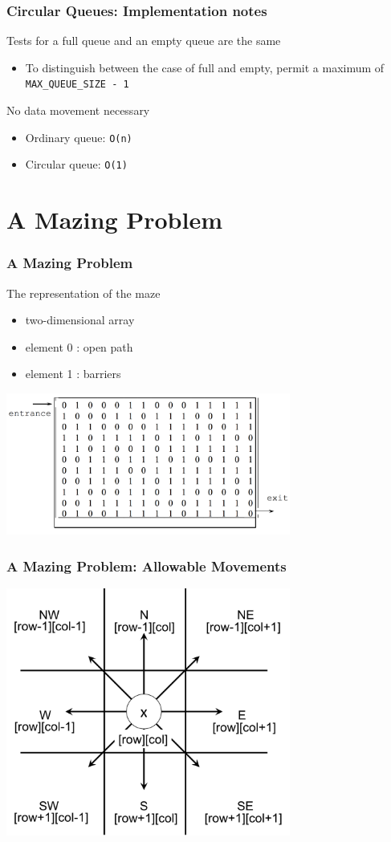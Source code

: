 \documentclass[newPxFont,sthlmFooter,nooffset]{beamer}
\begin{document}
\begin{frame}[t]
  \frametitle{Circular Queues: Implementation notes}
Tests for a full queue and an empty queue are the same
\begin{itemize}
\item To distinguish between the case of full and empty, permit a maximum of \texttt{MAX\_QUEUE\_SIZE - 1}
\end{itemize}
\bigskip
No data movement necessary
\begin{itemize}
\item Ordinary queue: \texttt{O(n)}
\item Circular queue: \texttt{O(1)}
\end{itemize}

\end{frame}

\section{A Mazing Problem}
\begin{frame}[t]
  \frametitle{A Mazing Problem}
The representation of the maze
\begin{itemize}
\item two-dimensional array
\item element 0 : open path
\item element 1 : barriers
\end{itemize}
\includegraphics[width=0.7\textwidth]{figures/fig06_maze.png}
\end{frame}

\begin{frame}[t]
  \frametitle{A Mazing Problem: Allowable Movements}
\includegraphics[width=0.7\textwidth]{figures/fig07_moves.png}
\end{frame}
\end{document}
